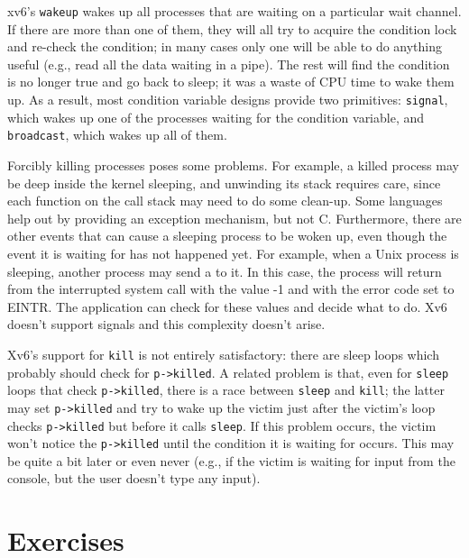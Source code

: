 xv6's
\lstinline{wakeup}
wakes up all processes that are waiting on a particular wait channel.
If there are more than one of them, they will all try to acquire
the condition lock and re-check the condition; in many cases only
one will be able to do anything useful (e.g., read all the
data waiting in a pipe). The rest will find
the condition is no longer true and go back to sleep;
it was a waste of CPU time to wake them up.
As a result,
most condition variable designs provide two primitives:
\lstinline{signal},
which wakes up one of the processes waiting for the condition variable, and
\lstinline{broadcast},
which wakes up all of them.

Forcibly killing processes poses some problems.
For example, a killed
process may be deep inside the kernel sleeping, and unwinding its
stack requires care, since each function on the call stack
may need to do some clean-up.  Some languages help out by providing
an exception mechanism, but not C.
Furthermore, there are other events that can cause a sleeping process to be
woken up, even though the event it is waiting for has not happened yet.  For
example, when a Unix process is sleeping, another process may send a 
to it.  In this case, the
process will return from the interrupted system call with the value -1 and with
the error code set to EINTR. The application can check for these values and
decide what to do.  Xv6 doesn't support signals and this complexity doesn't arise.

Xv6's support for
\lstinline{kill}
is not entirely satisfactory: there are sleep loops
which probably should check for
\lstinline{p->killed}.
A related problem is that, even for 
\lstinline{sleep}
loops that check
\lstinline{p->killed},
there is a race between 
\lstinline{sleep}
and
\lstinline{kill};
the latter may set
\lstinline{p->killed}
and try to wake up the victim just after the victim's loop
checks
\lstinline{p->killed}
but before it calls
\lstinline{sleep}.
If this problem occurs, the victim won't notice the
\lstinline{p->killed}
until the condition it is waiting for occurs. This may be quite a bit later
or even never
(e.g., if the victim is waiting for input from the console, but the user
doesn't type any input).

\section{Exercises}

